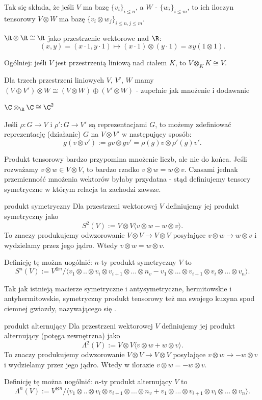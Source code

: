 Tak się składa, że jeśli $V$ ma bazę $\{v_i\}_{i\leq n}$, a $W$ - $\{w_i\}_{i\leq m}$, to ich iloczyn tensorowy $V\otimes W$ ma bazę $\{v_i\otimes w_j\}_{i\leq n, j\leq m}$.

\begin{example}[m]
  \item $\R\otimes \R\cong \R$ jako przestrzenie wektorowe nad $\R$: 
    $$(x,y)=(x\cdot 1, y\cdot 1)\mapsto (x\cdot 1)\otimes (y\cdot 1)=xy(1\otimes 1).$$
  \item Ogólniej: jeśli $V$ jest przestrzenią liniową nad ciałem $K$, to $V\otimes_KK\cong V$.
  \item Dla trzech przestrzeni liniowych $V$, $V'$, $W$ mamy $(V\oplus V')\otimes W\cong (V\otimes W)\oplus (V'\otimes W)$ - zupełnie jak mnożenie i dodawanie
  \item $\C\otimes_\R\C\cong \C^2$
\end{example}

Jeśli $\rho:G\to V$ i $\rho':G\to V'$ są reprezentacjami $G$, to możemy zdefiniować reprezentację (działanie) $G$ na $V\otimes V'$ w następujący sposób:
$$g(v\otimes v'):=gv\otimes gv'=\rho(g)v\otimes \rho'(g)v'.$$

Produkt tensorowy bardzo przypomina mnożenie liczb, ale nie do końca. Jeśli rozważamy $v\otimes w\in V\otimes V$, to bardzo rzadko $v\otimes w=w\otimes v$. Czasami jednak przemienność mnożenia wektorów byłaby przydatna - stąd definiujemy tensory symetryczne w którym relacja ta zachodzi zawsze.

\begin{definition}{produkt symetryczny}{}
  Dla przestrzeni wektorowej $V$ definiujemy jej produkt symetryczny jako
  $$S^2(V):=V\otimes V\langle v\otimes w-w\otimes v\rangle.$$
  To znaczy produkujemy odwzorowanie $V\otimes V\to V\otimes V$ posyłające $v\otimes w\to w\otimes v$ i wydzielamy przez jego jądro. Wtedy $v\otimes w=w\otimes v$.
  \bigskip
  
  Definicję tę można uogólnić: $n$-ty produkt symetryczny $V$ to
  $$S^n(V):=V^{\otimes n}/\langle v_1\otimes..\otimes v_i\otimes v_{i+1}\otimes...\otimes n_v-v_1\otimes...\otimes v_{i+1}\otimes v_i\otimes ... \otimes v_n\rangle.$$
\end{definition}

Tak jak istnieją macierze symetryczne i antysymetryczne, hermitowskie i antyhermitowskie, symetryczny produkt tensorowy też ma swojego kuzyna spod ciemnej gwiazdy, nazywającego się .

\begin{definition}{produkt alternujący}{}
  Dla przestrzeni wektorowej $V$ definiujemy jej produkt alternujący (potęga zewnętrzna) jako
  $$\Lambda^2(V):=V\otimes V\langle v\otimes w+w\otimes v\rangle.$$
  To znaczy produkujemy odwzorowanie $V\otimes V\to V\otimes V$ posyłające $v\otimes w\to -w\otimes v$ i wydzielamy przez jego jądro. Wtedy w ilorazie $v\otimes w=-w\otimes v$.
  \bigskip
  
  Definicję tę można uogólnić: $n$-ty produkt alternujący $V$ to
  $$\Lambda^n(V):=V^{\otimes n}/\langle v_1\otimes..\otimes v_i\otimes v_{i+1}\otimes...\otimes n_v+v_1\otimes...\otimes v_{i+1}\otimes v_i\otimes ... \otimes v_n\rangle.$$
\end{definition}


